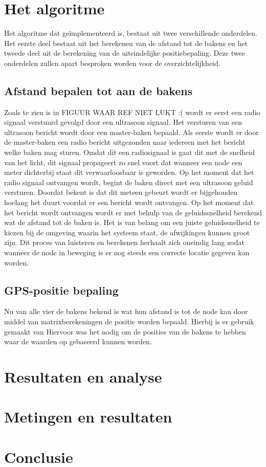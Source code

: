 \documentclass{article}
\begin{document}
\section{Het algoritme}
Het algoritme dat ge\"{i}mplementeerd is, bestaat uit twee verschillende onderdelen. Het eerste deel bestaat uit het berekenen van de afstand tot de bakens en het tweede deel uit de berekening van de uiteindelijke positiebepaling. Deze twee onderdelen zullen apart besproken worden voor de overzichtelijkheid.
	
\subsection{Afstand bepalen tot aan de bakens}
	Zoals te zien is in FIGUUR WAAR REF NIET LUKT :( wordt er eerst een radio signaal verstuurd gevolgd door een ultrasoon signaal. Het versturen van een ultrasoon bericht wordt door een master-baken bepaald. Als eerste wordt er door de master-baken een radio bericht uitgezonden naar iedereen met het bericht welke baken mag sturen. Omdat dit een radiosignaal is gaat dit met de snelheid van het licht, dit signaal propageert zo snel voort dat wanneer een node een meter dichterbij staat dit verwaarloosbaar is geworden. Op het moment dat het radio signaal ontvangen wordt, begint de baken direct met een ultrasoon geluid versturen. Doordat bekent is dat dit meteen gebeurt wordt er bijgehouden hoelang het duurt voordat er een bericht wordt ontvangen. Op het moment dat het bericht wordt ontvangen wordt er met behulp van de geluidssnelheid berekend wat de afstand tot de baken is. Het is van belang om een juiste geluidssnelheid te kiezen bij de omgeving waarin het systeem staat, de afwijkingen kunnen groot zijn. Dit proces van luisteren en berekenen herhaalt zich oneindig lang zodat wanneer de node in beweging is er nog steeds een correcte locatie gegeven kan worden. 
	
\subsection{GPS-positie bepaling}
Nu van alle vier de bakens bekend is wat hun afstand is tot de node kan door middel van matrixberekeningen de positie worden bepaald. Hierbij is er gebruik gemaakt van 
Hiervoor was het nodig om de posities van de bakens te hebben waar de waarden op gebaseerd kunnen worden. 

\section{Resultaten en analyse}

  
\section{Metingen en resultaten}

\section{Conclusie}

\newpage
\end{document}
